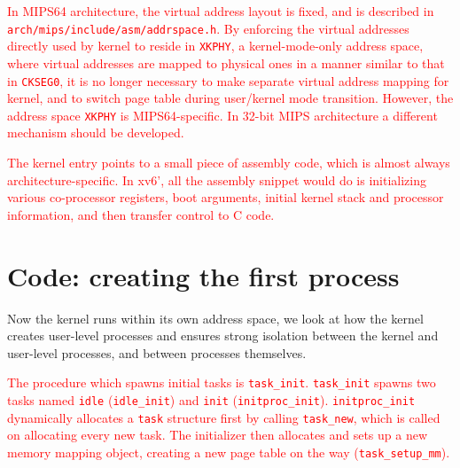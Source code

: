 \documentclass{report}
\begin{document}
	\textcolor{red}{	
		In MIPS64 architecture, the virtual address layout is fixed, and is described
		in \texttt{arch/mips/include/asm/addrspace.h}.  By enforcing the virtual addresses
		directly used by kernel to reside in \texttt{XKPHY}, a kernel-mode-only address space,
		where virtual addresses are mapped to physical ones in a manner similar to that in \texttt{CKSEG0},
		it is no longer necessary to make separate virtual address mapping for kernel, and to switch page
		table during user/kernel mode transition.  However, the address space \texttt{XKPHY} is
		MIPS64-specific.  In 32-bit MIPS architecture a different mechanism should be developed.
	}
	
	\textcolor{red}{
		The kernel entry points to a small piece of assembly code,
		which is almost always architecture-specific.  In xv6', all the assembly snippet would do is
		initializing various co-processor registers, boot arguments, initial kernel stack and processor
		information, and then transfer control to C code.
		\marginpar{
			\footnotesize\ttfamily
			\textcolor{red}{kern/init.c}
		}
	}
	
	\section{Code: creating the first process}
	Now the kernel runs within its own address space, we look at how the kernel creates 
	user-level processes and ensures strong isolation between the kernel and user-level
	processes, and between processes themselves.
	
	\textcolor{red}{
		The procedure which spawns initial tasks is \texttt{task\_init}.
		  \texttt{task\_init} spawns two tasks named \texttt{idle} (\texttt{idle\_init})
		and
		\texttt{init} (\texttt{initproc\_init}).
		\texttt{initproc\_init} dynamically allocates a \texttt{task} structure first by
		calling \texttt{task\_new},
		which is called on allocating every new task.  The initializer then allocates and 
		sets up a new memory mapping object, creating a new page table on the way
		\marginpar{
			\footnotesize\ttfamily
			\textcolor{red}{kern/sched/task.c:48}
		}
		(\texttt{task\_setup\_mm}).
	}
	
\end{document}
